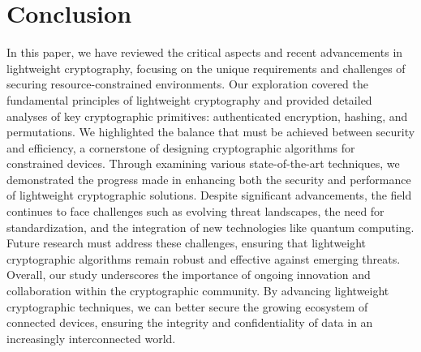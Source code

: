 \section{Conclusion}
In this paper, we have reviewed the critical aspects and recent advancements in lightweight cryptography, focusing on the unique requirements and challenges of securing resource-constrained environments. Our exploration covered the fundamental principles of lightweight cryptography and provided detailed analyses of key cryptographic primitives: authenticated encryption, hashing, and permutations.
\newline
We highlighted the balance that must be achieved between security and efficiency, a cornerstone of designing cryptographic algorithms for constrained devices. Through examining various state-of-the-art techniques, we demonstrated the progress made in enhancing both the security and performance of lightweight cryptographic solutions.
\newline
Despite significant advancements, the field continues to face challenges such as evolving threat landscapes, the need for standardization, and the integration of new technologies like quantum computing. Future research must address these challenges, ensuring that lightweight cryptographic algorithms remain robust and effective against emerging threats.
\newline
Overall, our study underscores the importance of ongoing innovation and collaboration within the cryptographic community. By advancing lightweight cryptographic techniques, we can better secure the growing ecosystem of connected devices, ensuring the integrity and confidentiality of data in an increasingly interconnected world.


